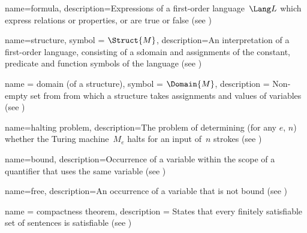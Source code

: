  {
  name={formula},  
  description={Expressions of a first-order language~$\Lang L$ which
    express relations or properties, or are true or false (see
    )} }

 {
  name={structure},
  symbol = {\ensuremath{\Struct{M}}},
  description={An interpretation of a first-order language, consisting
    of a \gls{sdomain} and assignments of the constant,
    predicate and function symbols of the language (see
    )} }

 {
  name = {domain (of a structure)},
  symbol = {\ensuremath{\Domain{M}}},
  description = {Non-empty set from from which a \gls{structure} takes
    assignments and values of {variables} (see
    )} }
 
 {
  name=halting problem,
  description={The problem of determining (for any $e$, $n$) whether
    the Turing machine~$M_e$ halts for an input of~$n$ strokes (see
    )} }

 {
  name=bound,
  description={Occurrence of a variable
    within the scope of a quantifier that uses the same
    variable (see )}
}

 {
  name=free,
    description={An occurrence of a variable that is not \gls{bound}
    (see )}
}

 {
  name = {compactness theorem},  
  description = {States that every \gls{finitely satisfiable} set of
    sentences is satisfiable (see
    )}}






